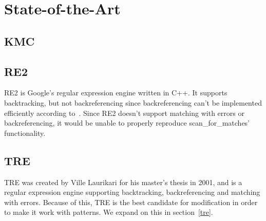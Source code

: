 \section{State-of-the-Art}
 \subsection{KMC}
 \subsection{RE2} %
 RE2 is Google's regular expression engine written in C++. It supports 
 backtracking, but not backreferencing since backreferencing can't be implemented 
 efficiently according to~\cite{web6}. Since RE2 doesn't support matching with 
 errors or backreferencing, it would be unable to properly reproduce 
 scan\_for\_matches' functionality.
 
 \subsection{TRE} %
 TRE was created by Ville Laurikari for his master's thesis in 2001, and 
 is a regular expression engine supporting backtracking, backreferencing and 
 matching with errors. Because of this, TRE is the best candidate for modification 
 in order to make it work with patterns. We expand on this in section~\ref{tre}.
